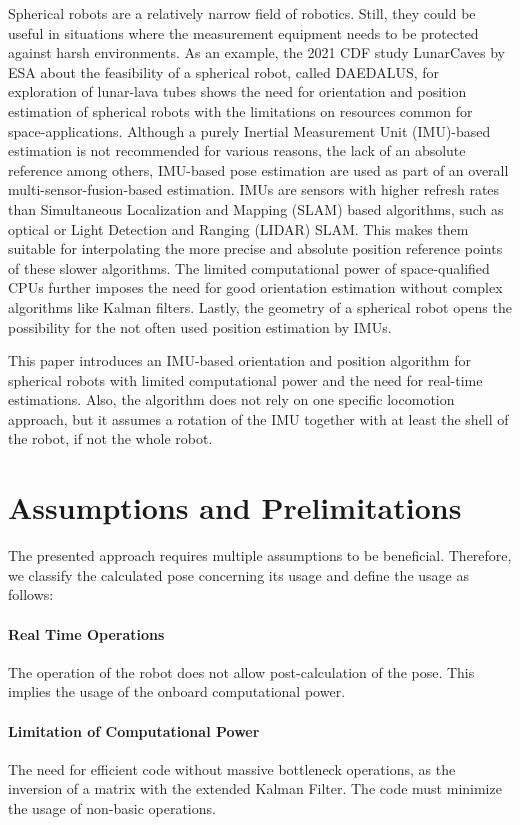 \documentclass[letterpaper, 10 pt, conference]{ieeeconf}  %
\begin{document}
Spherical robots are a relatively narrow field of robotics. Still, they could be useful in situations where the measurement equipment needs to be protected against harsh environments.
As an example, the 2021 CDF study LunarCaves by ESA about the feasibility of a spherical robot, called DAEDALUS, for exploration of lunar-lava tubes \cite{rossi2021daedalus} shows the need for orientation and position estimation of spherical robots with the limitations on resources common for space-applications.
Although a purely Inertial Measurement Unit (IMU)-based estimation is not recommended for various reasons, the lack of an absolute reference among others, IMU-based pose estimation are used as part of an overall multi-sensor-fusion-based estimation.
IMUs are sensors with higher refresh rates than Simultaneous Localization and Mapping (SLAM) based algorithms, such as optical or Light Detection and Ranging (LIDAR) SLAM. This makes them suitable for interpolating the more precise and absolute position reference points of these slower algorithms.
The limited computational power of space-qualified CPUs further imposes the need for good orientation estimation without complex algorithms like Kalman filters.
Lastly, the geometry of a spherical robot opens the possibility for the not often used position estimation by IMUs.

This paper introduces an IMU-based orientation and position algorithm for spherical robots with limited computational power and the need for real-time estimations.
Also, the algorithm does not rely on one specific locomotion approach, but it assumes a rotation of the IMU together with at least the shell of the robot, if not the whole robot. 


\section{Assumptions and Prelimitations}
\label{AssumptionsAndPrelimitations}
The presented approach requires multiple assumptions to be beneficial. Therefore, we classify the calculated pose concerning its usage and define the usage as follows:

\paragraph*{Real Time Operations}The operation of the robot does not allow post-calculation of the pose. This implies the usage of the onboard computational power.
\paragraph*{Limitation of Computational Power}
The need for efficient code without massive bottleneck operations, as the inversion of a matrix with the extended Kalman Filter. The code must minimize the usage of non-basic operations.
\end{document}
